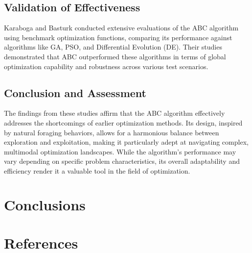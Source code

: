 \documentclass[a4paper, 12pt]{extarticle}
\begin{document}
\subsection{Validation of Effectiveness}
Karaboga and Basturk conducted extensive evaluations of the ABC algorithm using benchmark optimization functions, comparing its performance against algorithms like GA, PSO, and Differential Evolution (DE). Their studies demonstrated that ABC outperformed these algorithms in terms of global optimization capability and robustness across various test scenarios.\cite{karaboga2007powerful}\cite{karaboga2007artificial}

\subsection{Conclusion and Assessment}
The findings from these studies affirm that the ABC algorithm effectively addresses the shortcomings of earlier optimization methods. Its design, inspired by natural foraging behaviors, allows for a harmonious balance between exploration and exploitation, making it particularly adept at navigating complex, multimodal optimization landscapes. While the algorithm's performance may vary depending on specific problem characteristics, its overall adaptability and efficiency render it a valuable tool in the field of optimization.\cite{kaya2022review}

\newpage
\section{Conclusions}\label{sec:conc}
% 


\newpage
{}
\section{References}
\vspace{-24pt}
\renewcommand{\refname}{}


\end{document}
